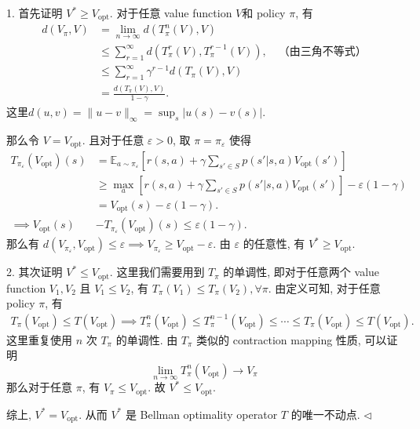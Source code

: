 \documentclass[11pt]{article}
\newenvironment{answer}[1][Solution]{\begin{trivlist}
\item[\hskip \labelsep {\bfseries #1.}\hskip \labelsep]}{\hfill$\lhd$\end{trivlist}}
\newcommand\1{\mathds{1}}
\newcommand\E{\mathbb{E}}
\begin{document}
\begin{answer}
    1. 首先证明 $V^* \ge V_\text{opt}$. 对于任意 value function $V$和 policy $\pi$, 有
    \begin{align*}
        d(V_\pi, V) &= \lim_{n\rightarrow \infty} d(T_\pi^n(V), V) \\
        &\le \sum_{r=1}^{\infty} d(T_{\pi}^{r}(V), T_\pi^{r-1}(V)), \quad \text{（由三角不等式）} \\
        &\le \sum_{r=1}^{\infty} \gamma^{r-1} d(T_\pi(V), V) \\
        &= \frac{d(T_\pi(V), V)}{1-\gamma}.
    \end{align*}
    这里$d(u,v) = \lVert u - v\rVert_\infty = \sup_s |u(s) - v(s)|$. 
    
    那么令 $V = V_\text{opt}$. 且对于任意 $\varepsilon >0$, 取 $\pi = \pi_\varepsilon$ 使得
    \begin{align*}
        T_{\pi_\varepsilon}(V_\text{opt})(s) &= \E_{a\sim \pi_\varepsilon} \left[r(s, a) + \gamma \sum_{s'\in S} p(s'|s, a) V_\text{opt}(s')\right] \\
        &\ge  \max_a \left[r(s, a) + \gamma \sum_{s'\in S} p(s'|s, a) V_\text{opt}(s')\right] - \varepsilon(1-\gamma) \\
        &=V_\text{opt}(s) - \varepsilon(1-\gamma). \\
        \implies  V_\text{opt}(s) &- T_{\pi_\varepsilon}(V_\text{opt})(s) \le \varepsilon(1-\gamma).
    \end{align*}
    那么有 $d(V_{\pi_\varepsilon}, V_\text{opt}) \le \varepsilon \implies V_{\pi_\varepsilon} \ge V_\text{opt} - \varepsilon$. 由 $\varepsilon$ 的任意性, 有 $V^* \ge V_\text{opt}$.

    2. 其次证明 $V^* \le V_\text{opt}$. 这里我们需要用到 $T_\pi$ 的单调性, 即对于任意两个 value function $V_1, V_2$ 且 $V_1 \le V_2$, 有 $T_\pi(V_1) \le T_\pi(V_2), \forall \pi$. 由定义可知, 对于任意 policy $\pi$, 有
    \begin{align*}
        T_\pi(V_\text{opt}) \le T(V_\text{opt}) \implies T^n_\pi(V_\text{opt}) \le T^{n-1}_\pi(V_\text{opt}) \le \cdots \le T_\pi(V_\text{opt}) \le T(V_\text{opt}). 
    \end{align*}
    这里重复使用 $n$ 次 $T_\pi$ 的单调性. 由 $T_\pi$ 类似的 contraction mapping 性质, 可以证明 
    \[\lim_{n\rightarrow\infty}T_\pi^n(V_\text{opt}) \to V_\pi\]
    那么对于任意 $\pi$, 有 $V_\pi \le V_\text{opt}$. 故 $V^* \le V_\text{opt}$.

    综上, $V^* = V_\text{opt}$. 从而 $V^*$ 是 Bellman optimality operator $T$ 的唯一不动点.
\end{answer}
\end{document}
